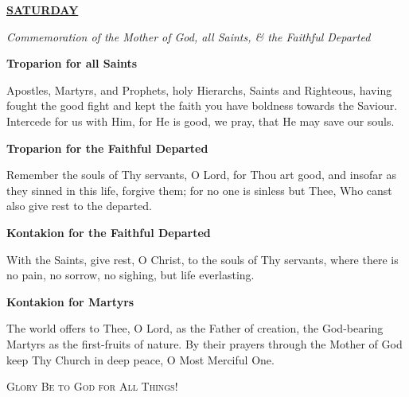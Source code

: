 \documentclass{article}
\newcommand{\sectionlinetwo}[2]{%
  \nointerlineskip \vspace{.5\baselineskip}\hspace{\fill}
  {\resizebox{0.9\linewidth}{1.3ex}
    {\pgfornament[color = #1]{#2}
    }}%
    \hspace{\fill}
    \par\nointerlineskip \vspace{.5\baselineskip}
  }
\begin{document}
\noindent
\centering
{
\footnotesize
\underline{\textbf{SATURDAY}}
}
\smallskip

\noindent
\centering
{
\color{red}
\footnotesize
\textit{Commemoration of the Mother of God, all Saints, \& the Faithful Departed}
}
\smallskip

\noindent
\centering
{
\footnotesize
\textbf{Troparion for all Saints}
}

\noindent
\justifying
{
\scriptsize
Apostles, Martyrs, and Prophets, holy Hierarchs, Saints and Righteous, having fought the good fight and kept the faith you have boldness towards the Saviour. Intercede for us with Him, for He is good, we pray, that He may save our souls.
}
\smallskip

\noindent
\centering
{
\footnotesize
\textbf{Troparion for the Faithful Departed}
}

\noindent
\justifying
{
\scriptsize
Remember the souls of Thy servants, O Lord, for Thou art good, and insofar as they sinned in this life, forgive them; for no one is sinless but Thee, Who canst also give rest to the departed.
}
\smallskip

\noindent
\centering
{
\footnotesize
\textbf{Kontakion for the Faithful Departed}
}

\noindent
\justifying
{
\scriptsize
With the Saints, give rest, O Christ, to the souls of Thy servants, where there is no pain, no sorrow, no sighing, but life everlasting.
}
\smallskip

\noindent
\centering
{
\footnotesize
\textbf{Kontakion for Martyrs}
}

\noindent
\justifying
{
\scriptsize
The world offers to Thee, O Lord, as the Father of creation, the God-bearing Martyrs as the first-fruits of nature. By their prayers through the Mother of God keep Thy Church in deep peace, O Most Merciful One.
}
\bigskip

\centering
{
\color{red}
\textsc{Glory Be to God for All Things!}
}
\medskip

\sectionlinetwo{red}{88}
\end{document}

